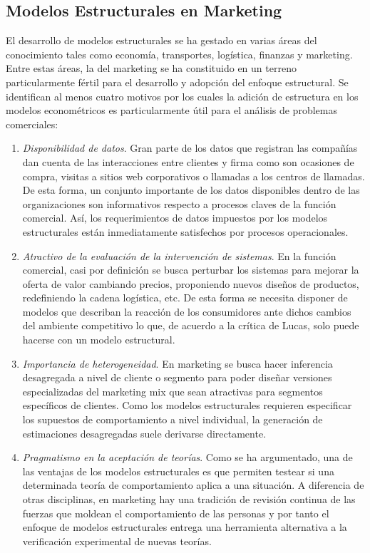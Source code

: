 \documentclass[
]{book}
\begin{document}
\subsection{Modelos Estructurales en Marketing}\label{modelos-estructurales-en-marketing}

El desarrollo de modelos estructurales se ha gestado en varias áreas del conocimiento tales como economía, transportes, logística, finanzas y marketing. Entre estas áreas, la del marketing se ha constituido en un terreno particularmente fértil para el desarrollo y adopción del enfoque estructural. Se identifican al menos cuatro motivos por los cuales la adición de estructura en los modelos econométricos es particularmente útil para el análisis de problemas comerciales:

\begin{enumerate}
\def\labelenumi{\arabic{enumi}.}
\item
  \emph{Disponibilidad de datos}. Gran parte de los datos que registran las compañías dan cuenta de las interacciones entre clientes y firma como son ocasiones de compra, visitas a sitios web corporativos o llamadas a los centros de llamadas. De esta forma, un conjunto importante de los datos disponibles dentro de las organizaciones son informativos respecto a procesos claves de la función comercial. Así, los requerimientos de datos impuestos por los modelos estructurales están inmediatamente satisfechos por procesos operacionales.
\item
  \emph{Atractivo de la evaluación de la intervención de sistemas}. En la función comercial, casi por definición se busca perturbar los sistemas para mejorar la oferta de valor cambiando precios, proponiendo nuevos diseños de productos, redefiniendo la cadena logística, etc. De esta forma se necesita disponer de modelos que describan la reacción de los consumidores ante dichos cambios del ambiente competitivo lo que, de acuerdo a la crítica de Lucas, solo puede hacerse con un modelo estructural.
\item
  \emph{Importancia de heterogeneidad}. En marketing se busca hacer inferencia desagregada a nivel de cliente o segmento para poder diseñar versiones especializadas del marketing mix que sean atractivas para segmentos específicos de clientes. Como los modelos estructurales requieren especificar los supuestos de comportamiento a nivel individual, la generación de estimaciones desagregadas suele derivarse directamente.
\item
  \emph{Pragmatismo en la aceptación de teorías}. Como se ha argumentado, una de las ventajas de los modelos estructurales es que permiten testear si una determinada teoría de comportamiento aplica a una situación. A diferencia de otras disciplinas, en marketing hay una tradición de revisión continua de las fuerzas que moldean el comportamiento de las personas y por tanto el enfoque de modelos estructurales entrega una herramienta alternativa a la verificación experimental de nuevas teorías.
\end{enumerate}
\end{document}
